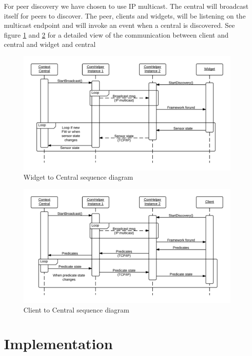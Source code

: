 \documentclass[]{report}
\begin{document}
For peer discovery we have chosen to use IP multicast. The central will broadcast itself for peers to discover. The peer, clients and widgets, will be listening on the multicast endpoint and will invoke an event when a central is discovered. See figure \ref{fig:widgetComHelper} and \ref{fig:clientComHelper} for a detailed view of the communication between client and central and widget and central

\begin{figure}
\centering
\includegraphics[width=\linewidth]{comHelperSequence-widget.png}
\caption{Widget to Central sequence diagram}
\label{fig:widgetComHelper}
\end{figure}

\begin{figure}
\centering
\includegraphics[width=\linewidth]{comHelperSequence-client.png}
\caption{Client to Central sequence diagram}
\label{fig:clientComHelper}
\end{figure}

\chapter{Implementation}
\end{document}

